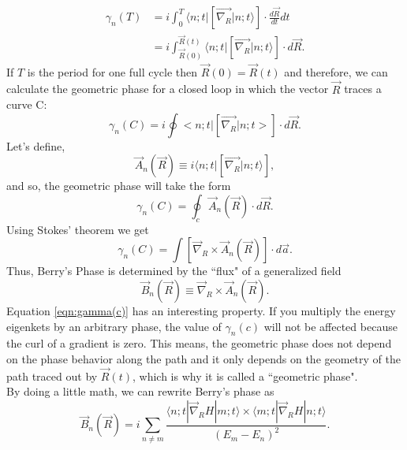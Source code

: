 \begin{equation}
\begin{split}
\gamma_n(T) &=i\int_0^T \langle n;t|\left[\vec{\nabla_R}|n;t \rangle \right]\cdot\frac{d\vec{R}}{dt} dt \\
&= i \int_{\vec{R}(0)} ^{\vec{R}(t)}  \langle n;t|\left[\vec{\nabla_R}|n;t\rangle\right]\cdot d\vec{R} .
\end{split}
\end{equation}
%
If $T$ is the period for one full cycle then $\vec{R}(0)=\vec{R}(t)$
and therefore, we can calculate the geometric phase for a closed loop
in which the vector $\vec{R}$ traces a curve C:
%
\begin{equation}
\gamma_n(C)=i \oint <n;t| \left[ \vec{\nabla_R} |n;t>\right] \cdot d\vec{R}.
\end{equation}
%
Let's define,
%
\begin{equation}
\vec{A}_n(\vec{R})\equiv i \langle n;t| \left[ \vec{\nabla_R} |n;t \rangle \right],
\end{equation}
and so, the geometric phase will take the form
%
\begin{equation}
\label{eqn:gamma(c)}
\gamma_n(C)=\oint_c \vec{A}_n(\vec{R}) \cdot d\vec{R}  .
\end{equation}
%
Using Stokes' theorem we get
%
\begin{equation}
\gamma_n(C)= \int \left[ \vec{\nabla}_R \times \vec{A}_n(\vec{R}) \right]  \cdot d\vec{a} .
\end{equation}
Thus, Berry's Phase is determined by the ``flux" of a generalized field
%
\begin{equation}
\vec{B}_n(\vec{R}) \equiv \vec{\nabla}_R \times \vec{A}_n(\vec{R}) .
\end{equation}
%
Equation \ref{eqn:gamma(c)} has an interesting property. If you
multiply the energy eigenkets by an arbitrary phase, the value of
$\gamma_n(c)$ will not be affected because the curl of a gradient is
zero. This means, the geometric phase does not depend on the phase
behavior along the path and it only depends on the geometry of the
path traced out by $\vec{R}(t)$, which is why it is called a
``geometric phase".
\\
By doing a little math, we can rewrite Berry's phase as
%
\begin{equation}
\vec{B}_n(\vec{R}) = i \sum_{n \neq m} \frac{ \langle n;t| \vec{\nabla}_R H |m;t \rangle \times  \langle m;t| \vec{\nabla}_R H |n;t \rangle }{(E_m-E_n)^2}.
\end{equation}


